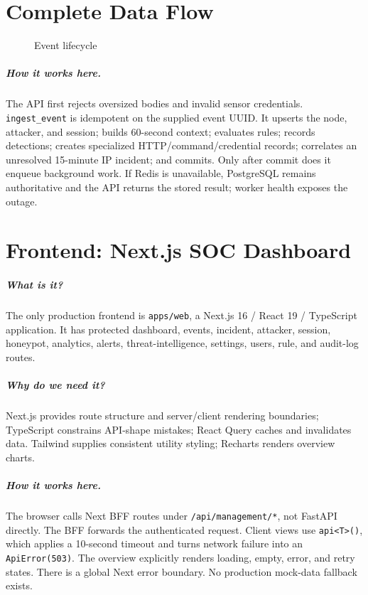 \documentclass[11pt,oneside]{book}
\newcommand{\what}[1]{\paragraph{What is it?}#1}
\newcommand{\why}[1]{\paragraph{Why do we need it?}#1}
\newcommand{\how}[1]{\paragraph{How it works here.}#1}
\begin{document}
\chapter{Complete Data Flow}
\begin{figure}[h]\centering{}\caption{Event lifecycle}\end{figure}
\how{The API first rejects oversized bodies and invalid sensor credentials. \texttt{ingest\_event} is idempotent on the supplied event UUID. It upserts the node, attacker, and session; builds 60-second context; evaluates rules; records detections; creates specialized HTTP/command/credential records; correlates an unresolved 15-minute IP incident; and commits. Only after commit does it enqueue background work. If Redis is unavailable, PostgreSQL remains authoritative and the API returns the stored result; worker health exposes the outage.}

\chapter{Frontend: Next.js SOC Dashboard}
\what{The only production frontend is \texttt{apps/web}, a Next.js 16 / React 19 / TypeScript application. It has protected dashboard, events, incident, attacker, session, honeypot, analytics, alerts, threat-intelligence, settings, users, rule, and audit-log routes.}
\why{Next.js provides route structure and server/client rendering boundaries; TypeScript constrains API-shape mistakes; React Query caches and invalidates data. Tailwind supplies consistent utility styling; Recharts renders overview charts.}
\how{The browser calls Next BFF routes under \texttt{/api/management/*}, not FastAPI directly. The BFF forwards the authenticated request. Client views use \texttt{api<T>()}, which applies a 10-second timeout and turns network failure into an \texttt{ApiError(503)}. The overview explicitly renders loading, empty, error, and retry states. There is a global Next error boundary. No production mock-data fallback exists.}
\end{document}
